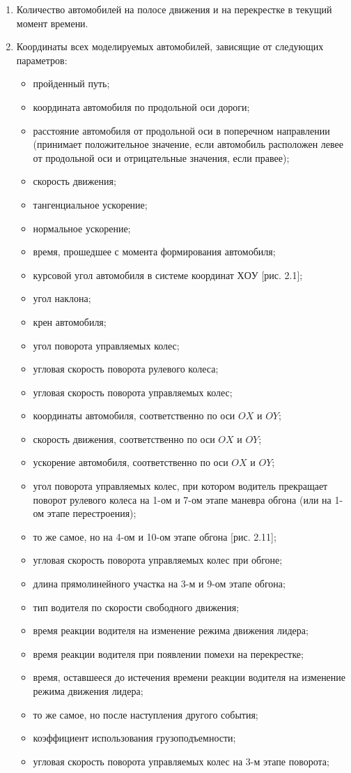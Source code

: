 \documentclass[a4paper,14pt]{article}
\begin{document}
\begin{enumerate}
\item Количество автомобилей на полосе движения и на перекрестке в текущий момент времени.
\item Координаты всех моделируемых автомобилей, зависящие от следующих параметров:

\begin{itemize}
\item пройденный путь;
\item координата автомобиля по продольной оси дороги;
\item расстояние автомобиля от продольной оси в поперечном направлении (принимает положительное значение, если автомобиль расположен левее от продольной оси и отрицательные значения, если правее);
\item скорость движения;
\item тангенциальное ускорение;
\item нормальное ускорение;
\item время, прошедшее с момента формирования автомобиля;
\item курсовой угол автомобиля в системе координат $ХОУ$ [рис. 2.1];
\item угол наклона;
\item крен автомобиля;
\item угол поворота управляемых колес;
\item угловая скорость поворота рулевого колеса;
\item угловая скорость поворота управляемых колес;
\item координаты автомобиля, соответственно по оси $OX$ и $OY$;
\item скорость движения, соответственно по оси $OX$ и $OY$;
\item ускорение автомобиля, соответственно по оси $OX$ и $OY$;
\item угол поворота управляемых колес, при котором водитель прекращает поворот рулевого колеса на 1-ом и 7-ом этапе маневра обгона (или на 1-ом этапе перестроения);
\item то же самое, но на 4-ом и 10-ом этапе обгона [рис. 2.11];
\item угловая скорость поворота управляемых колес при обгоне;
\item длина прямолинейного участка на 3-м и 9-ом этапе обгона;
\item тип водителя по скорости свободного движения;
\item время реакции водителя на изменение режима движения лидера;
\item время реакции водителя при появлении помехи на перекрестке;
\item время, оставшееся до истечения времени реакции водителя на изменение режима движения лидера;
\item то же самое, но после наступления другого события;
\item коэффициент использования грузоподъемности;
\item угловая скорость поворота управляемых колес на 3-м этапе поворота;


\end{itemize}
\end{enumerate}
\end{document}
